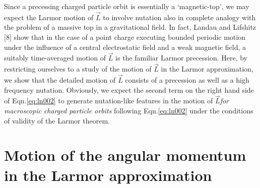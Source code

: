 Since a precessing charged particle orbit is essentially 
a `mag\-netic-top', we may expect the Larmor motion of 
$\vec{L}$ to involve nutation also in complete analogy 
with the problem of a massive top in a gravitational field. 
In fact, Landau and Lifshitz [8] show that in the case of a 
point charge executing bounded periodic motion under the 
influence of a central electrostatic field and a weak 
magnetic field, a suitably time-averaged motion of 
$\vec{L}$ 
is the familiar Larmor precession. Here, by restricting 
ourselves to a study of the motion of $\vec{L}$ in the 
Larmor approximation, we show that the detailed motion of 
$\vec{L}$ consists of a precession as well as a high 
frequency nutation. Obviously, we expect the second term on 
the right hand side of Eqn.\eqref{eq:ln002} to generate 
nutation-like features in the motion of 
$\vec{L}$\textsl{for 
macroscopic charged particle orbits} following 
Eqn.\eqref{eq:ln002} under the conditions of validity of 
the 
Larmor theorem.

\vspace{-.2cm}
\section{Motion of the angular momentum in the Larmor approximation}


